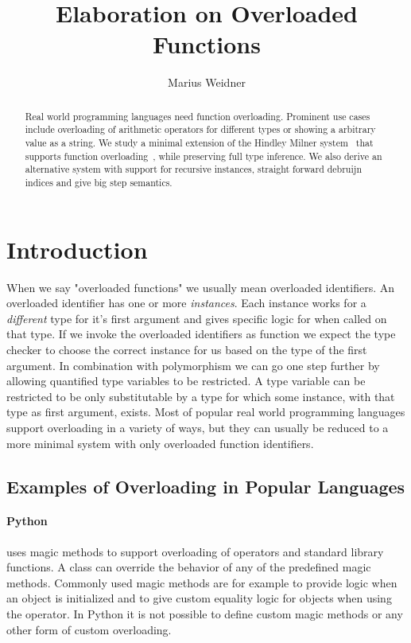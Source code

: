 \documentclass[runningheads]{llncs}
\newcommand{\snip}[1]{\footnotesize{\ttfamily{#1}}}
\begin{document}
\title{Elaboration on Overloaded Functions}
\author{Marius Weidner}
\maketitle

\begin{abstract}
Real world programming languages need function overloading. Prominent use cases include overloading of arithmetic operators for different types or showing a arbitrary value as a string. We study a minimal extension of the Hindley Milner system~\cite{hm78} that supports function overloading~\cite{oww95}, while preserving full type inference. We also derive an alternative system with support for recursive instances, straight forward debruijn indices and give big step semantics.
\end{abstract}

\section{Introduction}
When we say "overloaded functions" we usually mean overloaded identifiers. An overloaded identifier has one or more \emph{instances}. Each instance works for a \emph{different} type for it's first argument and gives specific logic for when called on that type. If we invoke the overloaded identifiers as function we expect the type checker to choose the correct instance for us based on the type of the first argument. In combination with polymorphism we can go one step further by allowing quantified type variables to be restricted. A type variable can be restricted to be only substitutable by a type for which some instance, with that type as first argument, exists. Most of popular real world programming languages support overloading in a variety of ways, but they can usually be reduced to a more minimal system with only overloaded function identifiers. 

\subsection{Examples of Overloading in Popular Languages}
\paragraph{Python} uses magic methods to support overloading of operators and standard library functions. A class can override the behavior of any of the predefined magic methods. Commonly used magic methods are for example \snip{\_\_init\_\_(self)} to provide logic when an object is initialized and \snip{\_\_eq\_\_(self, other)} to give custom equality logic for objects when using the \snip{==} operator. In Python it is not possible to define custom magic methods or any other form of custom overloading.
\end{document}
